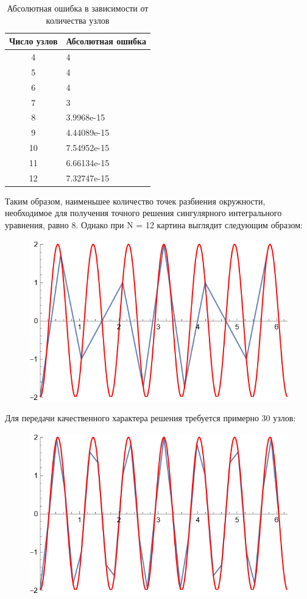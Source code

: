 \documentclass[12pt, a4paper]{article}
\begin{document}
\begin{enumerate}
		\begin{table}[H]
			\caption{Абсолютная ошибка в зависимости от количества узлов}
			\centering
			\begin{tabular}{|c|l|}
				\hline
				Число узлов & Абсолютная ошибка \\ \hline
				4      & 4                 \\ \hline
				5      & 4                 \\ \hline
				6      & 4                 \\ \hline
				7      & 3                 \\ \hline
				8      & 3.9968e-15        \\ \hline
				9      & 4.44089e-15       \\ \hline
				10      & 7.54952e-15       \\ \hline
				11      & 6.66134e-15       \\ \hline
				12      & 7.32747e-15       \\ \hline
			\end{tabular}
		\end{table}
		
		Таким образом, наименьшее количество точек разбиения окружности, необходимое для получения точного решения сингулярного интегрального уравнения, равно 8. Однако при N = 12 картина выглядит следующим образом:
		\begin{figure}[H]
			\centering
			\includegraphics[width=0.7\linewidth]{bad.png}
		\end{figure}
		
		Для передачи качественного характера решения требуется примерно 30 узлов:
		\begin{figure}[H]
			\centering
			\includegraphics[width=0.7\linewidth]{good.png}
		\end{figure}
		

\end{enumerate}
\end{document}
